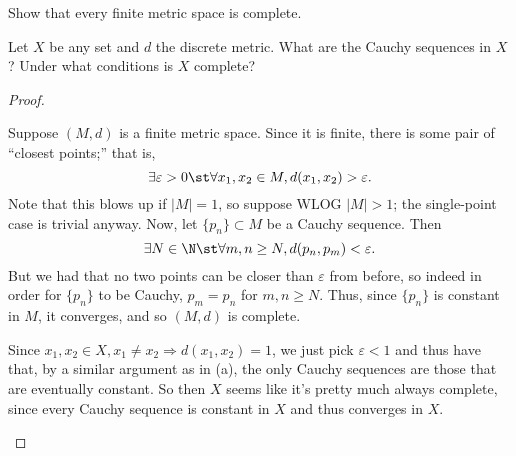 \documentclass{assignment}
\begin{document}
\begin{question}[2]
  \begin{qparts}
    \item Show that every finite metric space is complete.
    \item Let $X$ be any set and $d$ the discrete metric. What are the Cauchy sequences in $X$? Under 
what conditions is $X$ complete?
  \end{qparts}
\end{question}
\begin{proof}\leavevmode
  \begin{qparts}
     \item Suppose $(M, d)$ is a finite metric space. Since it is finite, there is some pair of ``closest
points;'' that is, $$\exists \varepsilon > 0 \st \forall x_1, x_2 \in M, d(x_1, x_2) > \varepsilon.$$ 
Note that this blows up if $|M| = 1$, so suppose WLOG $|M| > 1$; the single-point case is trivial anyway.
Now, let $\{p_n\} \subset M$ be a Cauchy sequence. Then $$\exists N\in\N \st \forall m,n \geq N, 
d(p_n, p_m) < \varepsilon.$$ But we had that no two points can be closer than $\varepsilon$ from before,
so indeed in order for $\{p_n\}$ to be Cauchy, $p_m = p_n$ for $m,n \geq N$. Thus, since $\{p_n\}$ is 
constant in $M$, it converges, and so $(M, d)$ is complete.

    \item Since $x_1, x_2 \in X, x_1 \neq x_2 \Rightarrow d(x_1, x_2) = 1$, we just pick $\varepsilon
< 1$ and thus have that, by a similar argument as in (a), the only Cauchy sequences are those that 
are eventually constant. So then $X$ seems like it's pretty much always complete, since every Cauchy
sequence is constant in $X$ and thus converges in $X$.
  \end{qparts}
\end{proof}
\end{document}
